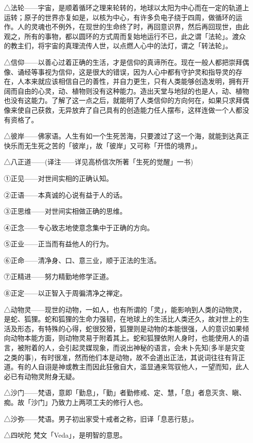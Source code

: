 \documentclass[12pt,twoside,openany]{book}
\begin{document}
△法轮——宇宙，是顺着循环之理来轮转的，地球以太阳为中心而在一定的轨道上运转；原子的世界亦复如是，以核为中心，有许多负电子绕于四周，做循环的运作。人的灵魂也不例外，在现世的生命终了时，再回意识界，然后再回现世，由此观之，所有的事物，都以圆环的方式周而复始地运行不已，此之谓「法轮」。渡众的教主们，将宇宙的真理流传人世，以点燃人心中的法灯，谓之「转法轮」。

△信仰——以善心过着正确的生活，才是信仰的真谛所在。现在一般人都把崇拜偶像、诵经等事视为信仰，这是很大的错误，因为人心中都有守护灵和指导灵的存在，人本来就应该相信自己的善性，并自力更生，只有人类能够创造发明，拥有开阔而自由的心灵，动、植物则没有这种能力。造出天堂与地狱的也是人，动、植物也没有这能力。了解了这一点之后，就能明了人类信仰的方向何在，如果只求拜偶像来使自己获救，无异放弃了自己具有的创造能力任人摆布，这样连做一个人都没有资格了。

△彼岸——佛家语。人生有如一个生死苦海，只要渡过了这一个海，就能到达真正快乐而无生死之苦的「彼岸」，故「彼岸」又可称「开悟的境界」。

△八正道——(译注——详见高桥信次所著「生死的觉醒」一书)

①正见——对世间实相的正确认知。

②正语——本真诚的心说有益于人的话。

③正思维——对世间实相做正确的思维。

④正念——专心致志地使意念集中于正确的方向。

⑤正业——正当而有益他人的行为。

⑥正命——清净身、口、意三业，顺于正法的生活。

⑦正精进——努力精勤地修学正道。

⑧正定——以正智入于周徧清净之禅定。

△动物灵——现世的动物，一如人，也有所谓的「灵」，能影响到人类的动物灵，是蛇、狐狸。蛇和狐狸的生命力强韧，在地球上的生活比人类还久，故对世上的生活及形态，有特殊的心得，蛇很狡猾，狐狸则是动物的本能很强，人的意识如果倾向动物本能方面，则动物灵易于附着其上。蛇和狐狸依附人身时，也能使用人的语言，被附着的人，会引起灵媒现象，而说出神秘的语言，会未卜先知(多半是灾变之类的事)，有时很准，然而他们本是动物，故不会道出正法，其说词往往有背正道。有的人自诩是神或教主而因此狂傲自大，滥显通来驾驭他人，一望而知，此人必已有动物灵附身无疑。

△沙门——梵语，意即「勤息」，「勤」者勤修戒、定、慧，「息」者息灭贪、瞋、痴。故「沙门」乃致力上两项工夫的修行人也。

△沙弥——梵语。男子初出家受十戒者之称，旧译「息恶行慈」。

△四吠陀	梵文「Veda」，是明智的意思。
\end{document}
